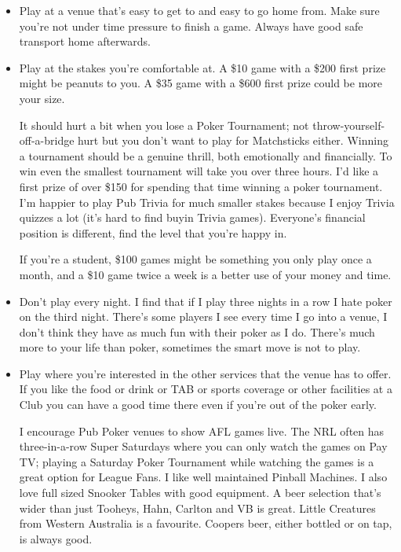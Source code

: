 \begin{itemize}

\item Play at a venue that's easy to get to and easy to go home
from. Make sure you're not under time pressure to finish a game.
Always have good safe transport home afterwards.

\item Play at the stakes you're comfortable at. A \$10
game with a \$200 first prize might be peanuts to you.
A \$35 game with a \$600 first prize could be more your size.

It should hurt a bit when you lose a Poker Tournament; not
throw-yourself-off-a-bridge hurt but you don't want to play for
Matchsticks either. Winning a tournament should be a genuine thrill,
both emotionally and financially. To win even the smallest tournament
will take you over three hours. I'd like a first prize of over \$150 for
spending that time winning a poker tournament. I'm happier to play Pub
Trivia for much smaller stakes because I enjoy Trivia quizzes a lot
(it's hard to find buyin Trivia games). Everyone's financial
position is different, find the level that you're happy in.

If you're a student, \$100 games might be something
you only play once a month, and a \$10 game twice a week is
a better use of your money and time.

\item Don't play every night. I find that if I play
three nights in a row I hate poker on the third
night. There's some players I see every time I go into a venue,
I don't think they have as much fun with their poker as I do.
There's much more to your life than poker, sometimes the smart
move is not to play.

\item Play where you're interested in the other services
that the venue has to offer. If you like the food or drink or
TAB or sports coverage or other facilities at a Club you can
have a good time there even if you're out of the poker early.

I encourage Pub Poker venues to show
AFL games live. The NRL often has three-in-a-row Super Saturdays
where you can only watch the games on Pay TV; playing a Saturday
Poker Tournament while watching the games is a great option
for League Fans. I like well maintained
Pinball Machines. I also love full sized Snooker Tables with good
equipment. A beer selection that's wider than
just Tooheys, Hahn, Carlton and VB is great. Little Creatures from Western
Australia is a favourite. Coopers beer, either bottled
or on tap, is always good.


\end{itemize}
